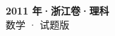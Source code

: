 \documentclass[zihao=-4, a4paper]{ctexart}
\begin{document}
\begin{center}
  {\Large\bfseries 2011 年·浙江卷·理科}\\[4pt]
  {\large 数学 · 试题版}
\end{center}
\medskip
{}

\end{document}
